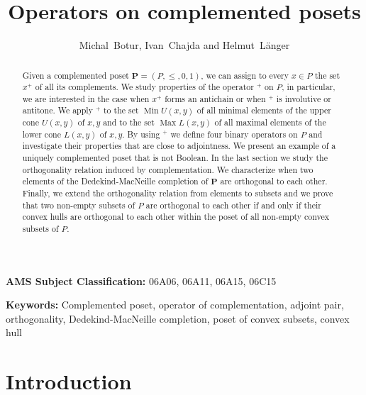 \documentclass[12pt]{article}
\title{Operators on complemented posets}
\author{Michal~Botur, Ivan~Chajda and Helmut~L\"anger}
\date{}
\DeclareMathOperator{\Max}{Max}
\DeclareMathOperator{\Min}{Min}
\begin{document}

\maketitle
	
\begin{abstract}
Given a complemented poset $\mathbf P=(P,\le,0,1)$, we can assign to every $x\in P$ the set $x^+$ of all its complements. We study properties of the operator $^+$ on $P$, in particular, we are interested in the case when $x^+$ forms an antichain or when $^+$ is involutive or antitone. We apply $^+$ to the set $\Min U(x,y)$ of all minimal elements of the upper cone $U(x,y)$ of $x,y$ and to the set $\Max L(x,y)$ of all maximal elements of the lower cone $L(x,y)$ of $x,y$. By using $^+$ we define four binary operators on $P$ and investigate their properties that are close to adjointness. We present an example of a uniquely complemented poset that is not Boolean. In the last section we study the orthogonality relation induced by complementation. We characterize when two elements of the Dedekind-MacNeille completion of $\mathbf P$ are orthogonal to each other. Finally, we extend the orthogonality relation from elements to subsets and we prove that two non-empty subsets of $P$ are orthogonal to each other if and only if their convex hulls are orthogonal to each other within the poset of all non-empty convex subsets of $P$.
\end{abstract}

{\bf AMS Subject Classification:} 06A06, 06A11, 06A15, 06C15

{\bf Keywords:} Complemented poset, operator of complementation, adjoint pair, orthogonality, Dedekind-MacNeille completion, poset of convex subsets, convex hull

\section{Introduction}
\end{document}

